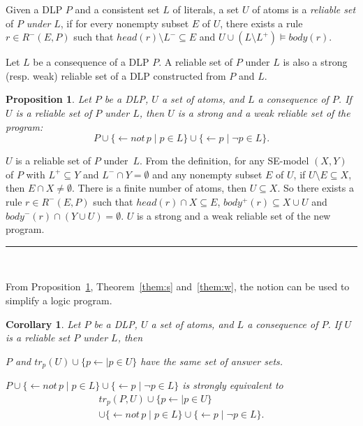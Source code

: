 \documentclass{article}
\newenvironment{tight_enumerate1}{
\begin{enumerate}[(i)]
  \setlength{\itemsep}{0pt}%
  \setlength{\topsep}{0pt}%
  \setlength{\partopsep}{0pt}%
  \setlength{\parskip}{0pt}%
  \setlength{\parsep}{0pt}%
}{\end{enumerate}}
\newtheorem{proposition}{Proposition}
\newtheorem{corollary}[theorem]{Corollary}
\newenvironment{proofs}{{\bf Proof Sketch:}}{\rule{2mm}{2mm}\\[-.5em] }
\newcommand{\Not}{not \,}
\newcommand{\trp}{tr_p}
\begin{document}
Given a DLP $P$ and a consistent set $L$ of literals, a set $U$ of atoms is a
{\em reliable set} of $P$ {\em under} $L$, if for every nonempty subset $E$ of $U$, there exists a rule $r\in R^-(E, P)$ such that $head(r)\setminus L^- \subseteq E$ and $U\cup (L\setminus L^+)\models body(r)$.



Let $L$ be a consequence of a DLP $P$. A reliable set of $P$ under $L$ is also a strong (resp. weak) reliable set of a DLP constructed from $P$ and $L$.
\begin{proposition}\label{prop:x}
  Let $P$ be a DLP, $U$ a set of atoms, and $L$ a consequence of $P$.
 If $U$ is a reliable set of $P$ under $L$, then $U$ is a strong and a weak reliable set of the program:
    \[
    P\cup \{\gets \Not p\mid p\in L\}\cup \{\gets p\mid \neg p\in L\}.
    \]
\end{proposition}
\begin{proofs}
  $U$ is a reliable set of $P$ under~$L$.
  From the definition,
  for any SE-model $(X, Y)$ of $P$ with $L^+\subseteq Y$ and $L^-\cap Y=\emptyset$ and any nonempty subset $E$ of $U$, if $U\setminus E \subseteq X$, then $E\cap X \neq\emptyset$. There is a finite number of atoms, then $U\subseteq X$. So there exists a rule $r\in R^-(E, P)$ such that $head(r)\cap X \subseteq E$, $body^+(r)\subseteq X\cup U$ and $body^-(r)\cap (Y\cup U) = \emptyset$. $U$ is a strong and a weak reliable set of the new program.
%
\end{proofs}

From Proposition~\ref{prop:x}, Theorem~\ref{them:s} and~\ref{them:w}, the notion can be used to simplify a logic program.
\begin{corollary}\label{corol:1}
  Let $P$ be a DLP, $U$ a set of atoms, and $L$ a consequence of $P$. If $U$ is a reliable set $P$ under $L$, then
  \begin{tight_enumerate1}
    \item $P$ and $\trp(U)\cup \{p\gets \mid p\in U\}$ have the same set of answer sets.
    \item $P\cup \{\gets \Not p\mid p\in L\} \cup \{\gets p\mid \neg p\in L\}$ is strongly equivalent to
    \begin{multline*}
   \trp(P, U) \cup \{p\gets \mid p\in U\}\\\cup \{\gets \Not p\mid p\in L\} \cup \{\gets p\mid \neg p\in L\}.
   \end{multline*}
  \end{tight_enumerate1}
\end{corollary}
\end{document}

